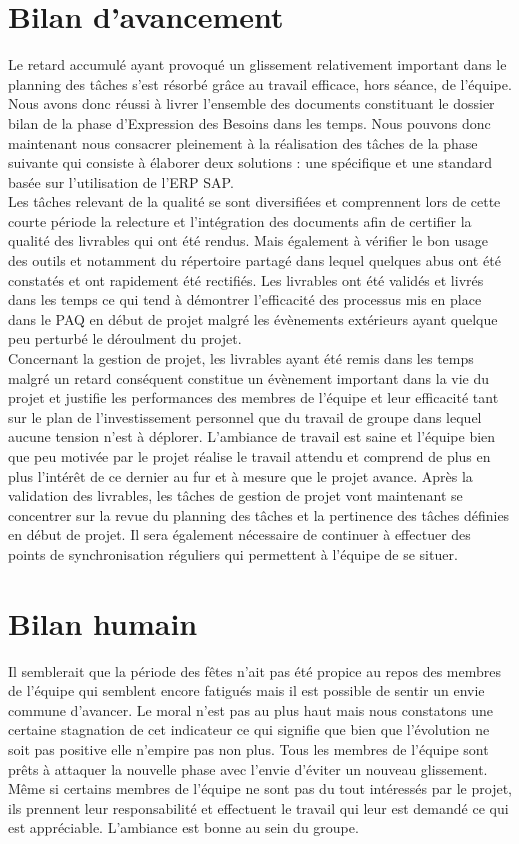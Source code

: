 
\section{Bilan d'avancement}

Le retard accumulé ayant provoqué un glissement relativement important dans le planning des tâches s'est résorbé grâce au travail efficace, hors séance, de l'équipe. Nous avons donc réussi à livrer l'ensemble des documents constituant le dossier bilan de la phase d'Expression des Besoins dans les temps. Nous pouvons donc maintenant nous consacrer pleinement à la réalisation des tâches de la phase suivante qui consiste à élaborer deux solutions : une spécifique et une standard basée sur l'utilisation de l'ERP SAP. \\

Les tâches relevant de la qualité se sont diversifiées et comprennent lors de cette courte période la relecture et l'intégration des documents afin de certifier la qualité des livrables qui ont été rendus. Mais également à vérifier le bon usage des outils et notamment du répertoire partagé dans lequel quelques abus ont été constatés et ont rapidement été rectifiés. Les livrables ont été validés et livrés dans les temps ce qui tend à démontrer l'efficacité des processus mis en place dans le PAQ en début de projet malgré les évènements extérieurs ayant quelque peu perturbé le déroulment du projet.\\

Concernant la gestion de projet, les livrables ayant été remis dans les temps malgré un retard conséquent constitue un évènement important dans la vie du projet et justifie les performances des membres de l'équipe et leur efficacité tant sur le plan de l'investissement personnel que du travail de groupe dans lequel aucune tension n'est à déplorer. L'ambiance de travail est saine et l'équipe bien que peu motivée par le projet réalise le travail attendu et comprend de plus en plus l'intérêt de ce dernier au fur et à mesure que le projet avance. Après la validation des livrables, les tâches de gestion de projet vont maintenant se concentrer sur la revue du planning des tâches et la pertinence des tâches définies en début de projet. Il sera également nécessaire de continuer à effectuer des points de synchronisation réguliers qui permettent à l'équipe de se situer.

\section{Bilan humain}

Il semblerait que la période des fêtes n'ait pas été propice au repos des membres de l'équipe qui semblent encore fatigués mais il est possible de sentir un envie commune d'avancer. Le moral n'est pas au plus haut mais nous constatons une certaine stagnation de cet indicateur ce qui signifie que bien que l'évolution ne soit pas positive elle n'empire pas non plus. Tous les membres de l'équipe sont prêts à attaquer la nouvelle phase avec l'envie d'éviter un nouveau glissement. Même si certains membres de l'équipe ne sont pas du tout intéressés par le projet, ils prennent leur responsabilité et effectuent le travail qui leur est demandé ce qui est appréciable. L'ambiance est bonne au sein du groupe.
